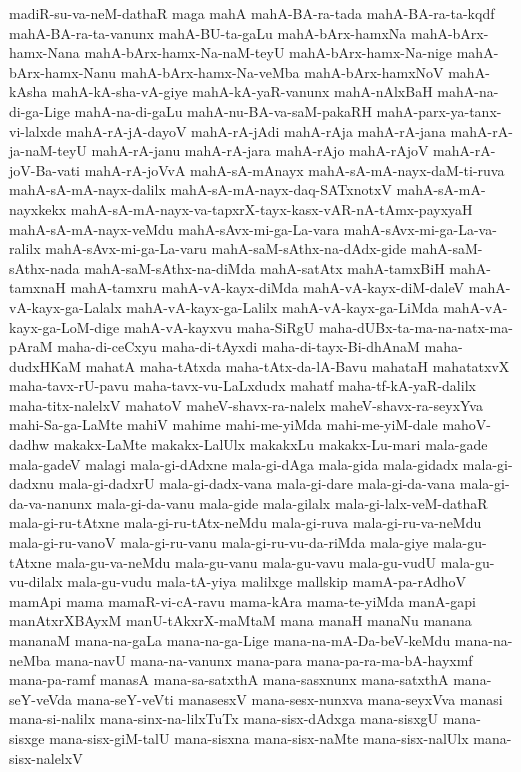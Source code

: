 {madiR-su-va-neM-dathaR
maga
mahA
mahA-BA-ra-tada
mahA-BA-ra-ta-kqdf
mahA-BA-ra-ta-vanunx
mahA-BU-ta-gaLu
mahA-bArx-hamxNa
mahA-bArx-hamx-Nana
mahA-bArx-hamx-Na-naM-teyU
mahA-bArx-hamx-Na-nige
mahA-bArx-hamx-Nanu
mahA-bArx-hamx-Na-veMba
mahA-bArx-hamxNoV
mahA-kAsha
mahA-kA-sha-vA-giye
mahA-kA-yaR-vanunx
mahA-nAlxBaH
mahA-na-di-ga-Lige
mahA-na-di-gaLu
mahA-nu-BA-va-saM-pakaRH
mahA-parx-ya-tanx-vi-lalxde
mahA-rA-jA-dayoV
mahA-rA-jAdi
mahA-rAja
mahA-rA-jana
mahA-rA-ja-naM-teyU
mahA-rA-janu
mahA-rA-jara
mahA-rAjo
mahA-rAjoV
mahA-rA-joV-Ba-vati
mahA-rA-joVvA
mahA-sA-mAnayx
mahA-sA-mA-nayx-daM-ti-ruva
mahA-sA-mA-nayx-dalilx
mahA-sA-mA-nayx-daq-SATxnotxV
mahA-sA-mA-nayxkekx
mahA-sA-mA-nayx-va-tapxrX-tayx-kasx-vAR-nA-tAmx-payxyaH
mahA-sA-mA-nayx-veMdu
mahA-sAvx-mi-ga-La-vara
mahA-sAvx-mi-ga-La-va-ralilx
mahA-sAvx-mi-ga-La-varu
mahA-saM-sAthx-na-dAdx-gide
mahA-saM-sAthx-nada
mahA-saM-sAthx-na-diMda
mahA-satAtx
mahA-tamxBiH
mahA-tamxnaH
mahA-tamxru
mahA-vA-kayx-diMda
mahA-vA-kayx-diM-daleV
mahA-vA-kayx-ga-Lalalx
mahA-vA-kayx-ga-Lalilx
mahA-vA-kayx-ga-LiMda
mahA-vA-kayx-ga-LoM-dige
mahA-vA-kayxvu
maha-SiRgU
maha-dUBx-ta-ma-na-natx-ma-pAraM
maha-di-ceCxyu
maha-di-tAyxdi
maha-di-tayx-Bi-dhAnaM
maha-dudxHKaM
mahatA
maha-tAtxda
maha-tAtx-da-lA-Bavu
mahataH
mahatatxvX
maha-tavx-rU-pavu
maha-tavx-vu-LaLxdudx
mahatf
maha-tf-kA-yaR-dalilx
maha-titx-nalelxV
mahatoV
maheV-shavx-ra-nalelx
maheV-shavx-ra-seyxYva
mahi-Sa-ga-LaMte
mahiV
mahime
mahi-me-yiMda
mahi-me-yiM-dale
mahoV-dadhw
makakx-LaMte
makakx-LalUlx
makakxLu
makakx-Lu-mari
mala-gade
mala-gadeV
malagi
mala-gi-dAdxne
mala-gi-dAga
mala-gida
mala-gidadx
mala-gi-dadxnu
mala-gi-dadxrU
mala-gi-dadx-vana
mala-gi-dare
mala-gi-da-vana
mala-gi-da-va-nanunx
mala-gi-da-vanu
mala-gide
mala-gilalx
mala-gi-lalx-veM-dathaR
mala-gi-ru-tAtxne
mala-gi-ru-tAtx-neMdu
mala-gi-ruva
mala-gi-ru-va-neMdu
mala-gi-ru-vanoV
mala-gi-ru-vanu
mala-gi-ru-vu-da-riMda
mala-giye
mala-gu-tAtxne
mala-gu-va-neMdu
mala-gu-vanu
mala-gu-vavu
mala-gu-vudU
mala-gu-vu-dilalx
mala-gu-vudu
mala-tA-yiya
malilxge
mallskip
mamA-pa-rAdhoV
mamApi
mama
mamaR-vi-cA-ravu
mama-kAra
mama-te-yiMda
manA-gapi
manAtxrXBAyxM
manU-tAkxrX-maMtaM
mana
manaH
manaNu
manana
mananaM
mana-na-gaLa
mana-na-ga-Lige
mana-na-mA-Da-beV-keMdu
mana-na-neMba
mana-navU
mana-na-vanunx
mana-para
mana-pa-ra-ma-bA-hayxmf
mana-pa-ramf
manasA
mana-sa-satxthA
mana-sasxnunx
mana-satxthA
mana-seY-veVda
mana-seY-veVti
manasesxV
mana-sesx-nunxva
mana-seyxVva
manasi
mana-si-nalilx
mana-sinx-na-lilxTuTx
mana-sisx-dAdxga
mana-sisxgU
mana-sisxge
mana-sisx-giM-talU
mana-sisxna
mana-sisx-naMte
mana-sisx-nalUlx
mana-sisx-nalelxV
}
